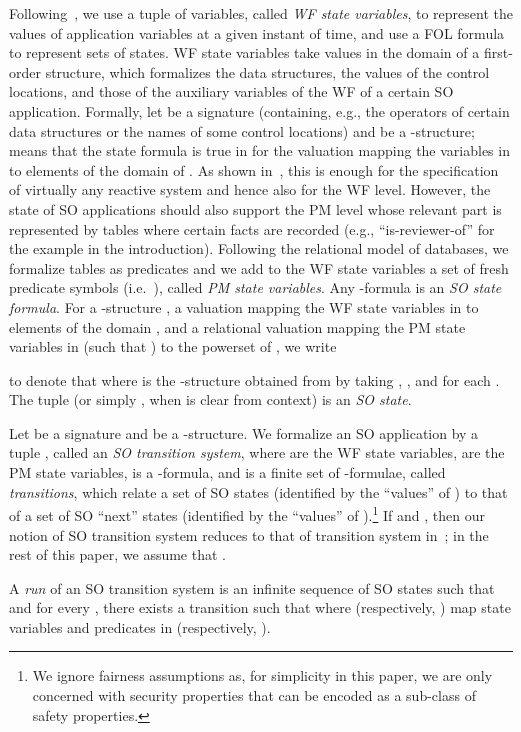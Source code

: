 \documentclass[conference]{IEEEtran}
\begin{document}
Following~\cite{manna-pnueli-book}, we use a tuple  of
variables, called \emph{WF state variables}, to represent the values
of application variables at a given instant of time, and use a FOL
formula  to represent sets of states.  WF
state variables take values in the domain of a first-order structure,
which formalizes the data structures, the values of the control
locations, and those of the auxiliary variables of the WF of a certain
SO application.  Formally, let  be a signature (containing,
e.g., the operators of certain data structures or the names of some
control locations) and  be a -structure;
 means that the state
formula  is true in  for the
valuation  mapping the variables in  to elements
of the domain of .  As shown in~\cite{manna-pnueli-book},
this is enough for the specification of virtually any reactive system
and hence also for the WF level.  However, the state of SO
applications should also support the PM level whose relevant part is
represented by tables where certain facts are recorded (e.g.,
``is-reviewer-of'' for the example in the introduction).  Following
the relational model of databases, we formalize tables as predicates
and we add to the WF state variables a set  of fresh
predicate symbols (i.e.\ ), called
\emph{PM state variables}.  Any -formula
 is an \emph{SO state formula}. 
For a -structure , a valuation  mapping
the WF state variables in  to elements of the
domain , and a relational valuation  mapping the PM state
variables in  (such that ) to the powerset of , we write 

to denote that  where
 is the -structure obtained from  by taking
, , and  for each .  The tuple  (or simply , when
 is clear from context) is an \emph{SO state}.

Let  be a signature and  be a -structure.
We formalize an SO application by a tuple
, called an
\emph{SO transition system}, where  are the WF state
variables,  are the PM state variables,  is a
-formula, and  is a
finite set of
-formulae,
called \emph{transitions}, which relate a set of SO states (identified
by the ``values'' of ) to that of a set
of SO ``next'' states (identified by the ``values'' of
).\footnote{We ignore fairness
  assumptions as, for simplicity in this paper, we are only concerned
  with security properties that can be encoded as a sub-class of
  safety properties.}  If  and
, then our notion of SO transition system
reduces to that of transition system in~\cite{manna-pnueli-book}; in
the rest of this paper, we assume that .

A \emph{run} of an SO transition system  is an infinite sequence of SO states  such that  and for every , there
exists a transition
 such that  where
 (respectively, ) map state variables and predicates in
 (respectively, ).
\end{document}
